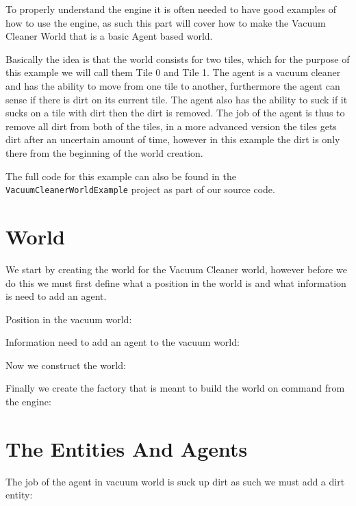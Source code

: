 To properly understand the engine it is often needed to have good
examples of how to use the engine, as such this part will cover how
to make the Vacuum Cleaner World that is a basic Agent based world.

Basically the idea is that the world consists for two tiles, which
for the purpose of this example we will call them Tile 0 and Tile
1. The agent is a vacuum cleaner and has the ability to move from
one tile to another, furthermore the agent can sense if there is dirt
on its current tile. The agent also has the ability to suck if it
sucks on a tile with dirt then the dirt is removed. The job of the
agent is thus to remove all dirt from both of the tiles, in a more
advanced version the tiles gets dirt after an uncertain amount of
time, however in this example the dirt is only there from the beginning
of the world creation.

The full code for this example can also be found in the \texttt{VacuumCleanerWorldExample}
project as part of our source code.


\section{World}

We start by creating the world for the Vacuum Cleaner world, however
before we do this we must first define what a position in the world
is and what information is need to add an agent.

Position in the vacuum world:



Information need to add an agent to the vacuum world:



Now we construct the world:



Finally we create the factory that is meant to build the world on
command from the engine:




\section{The Entities And Agents}

The job of the agent in vacuum world is suck up dirt as such we must
add a dirt entity:

